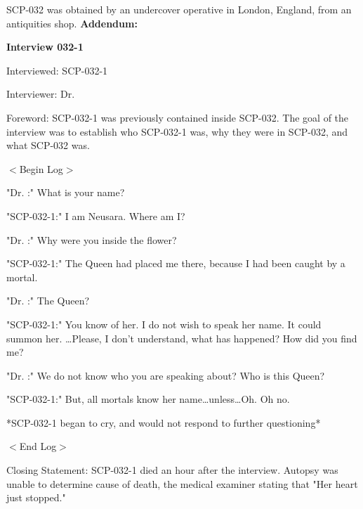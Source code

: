 SCP-032 was obtained by an undercover operative in London, England, from an antiquities shop.
\newpage
\textbf{Addendum:}

\textbf{Interview 032-1}

Interviewed: SCP-032-1

Interviewer: Dr. 

Foreword: SCP-032-1 was previously contained inside SCP-032. The goal of the interview was to establish who SCP-032-1 was, why they were in SCP-032, and what SCP-032 was.

$<$Begin Log$>$

"Dr. :" What is your name?

"SCP-032-1:" I am Neusara. Where am I?

"Dr. :" Why were you inside the flower?

"SCP-032-1:" The Queen had placed me there, because I had been caught by a mortal.

"Dr. :" The Queen?

"SCP-032-1:" You know of her. I do not wish to speak her name. It could summon her. …Please, I don't understand, what has happened? How did you find me?

"Dr. :" We do not know who you are speaking about? Who is this Queen?

"SCP-032-1:" But, all mortals know her name…unless…Oh. Oh no.

*SCP-032-1 began to cry, and would not respond to further questioning*

$<$End Log$>$

Closing Statement: SCP-032-1 died an hour after the interview. Autopsy was unable to determine cause of death, the medical examiner stating that "Her heart just stopped."